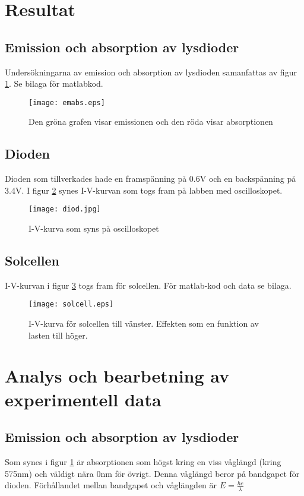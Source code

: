 \documentclass[a4paper]{article}
\begin{document}
\newpage
\section{Resultat}
\subsection{Emission och absorption av lysdioder}
Undersökningarna av emission och absorption av lysdioden samanfattas av figur \ref{emabs}. Se bilaga för matlabkod.
\begin{figure}[H]
        \centering
        \texttt{[image: emabs.eps]}
        \caption{Den gröna grafen visar emissionen och den röda visar absorptionen}
        \label{emabs}
\end{figure}

\subsection{Dioden}
Dioden som tillverkades hade en framspänning på 0.6V och en backspänning på 3.4V. I figur \ref{diodiv} synes I-V-kurvan som togs fram på labben med oscilloskopet.
\begin{figure}[H]
	\centering
	\texttt{[image: diod.jpg]}
	\caption{I-V-kurva som syns på oscilloskopet}
	\label{diodiv}
\end{figure}
\subsection{Solcellen}
I-V-kurvan i figur \ref{solcelliv} togs fram för solcellen. För matlab-kod och data se bilaga.
\begin{figure}[H]
	\centering
	\texttt{[image: solcell.eps]}
	\caption{I-V-kurva för solcellen till vänster. Effekten som en funktion av lasten till höger.}
	\label{solcelliv}
\end{figure}

\section{Analys och bearbetning av experimentell data}
\subsection{Emission och absorption av lysdioder}
Som synes i figur \ref{emabs} är absorptionen som högst kring en viss våglängd (kring 575nm) och väldigt nära 0nm för övrigt. Denna våglängd beror på bandgapet för dioden. Förhållandet mellan bandgapet och våglängden är $E = \frac{hc}{\lambda}$
\end{document}
